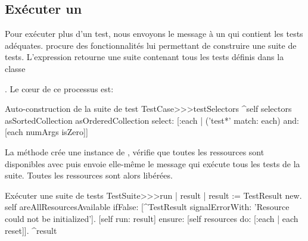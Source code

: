 \documentclass[a4paper,10pt,twoside]{book}
\begin{document}
\subsection{Exécuter un }
Pour exécuter plus d'un test, nous envoyons le message  à un  qui contient les tests adéquates.  procure des fonctionnalités lui permettant de construire  une suite de tests. L'expression  retourne une suite contenant tous les tests définis dans la classe {. Le c\oe ur de ce processus est:
\begin{method}[testcasetestselectors]{Auto-construction de la suite de test}
TestCase>>>testSelectors 
	^self selectors asSortedCollection asOrderedCollection select: [:each | 
		('test*' match: each) and: [each numArgs isZero]]
\end{method}

La méthode  crée une instance de , vérifie que toutes les ressources sont disponibles avec  puis envoie elle-même le message  qui exécute tous les tests de la suite. Toutes les ressources sont alors libérées.
\begin{method}[testsuiterun]{Exécuter une suite de tests}
TestSuite>>>run
	| result |
	result := TestResult new.
	self areAllResourcesAvailable
		ifFalse: [^TestResult signalErrorWith:
				   'Resource could not be initialized'].
	[self run: result] ensure: [self resources do:
									 [:each | each reset]].
	^result
\end{method}

}
\end{document}
